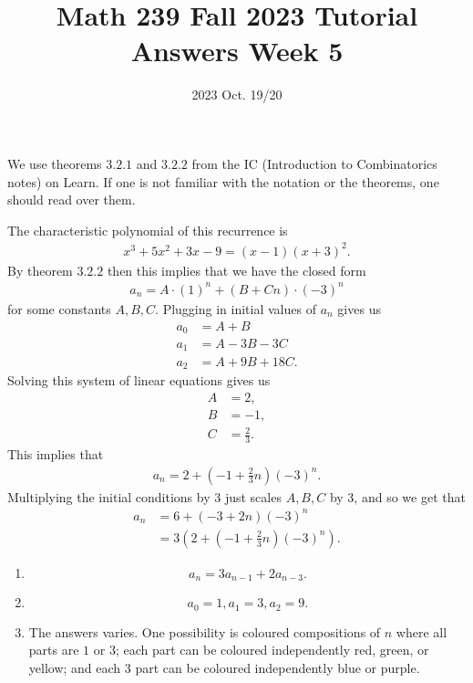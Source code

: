 \title{Math 239 Fall 2023 Tutorial Answers Week 5}
\date{2023 Oct. 19/20}
\maketitle

\begin{enumerate}
     We use theorems $3.2.1$ and $3.2.2$ from the IC (Introduction to Combinatorics notes) on Learn. If one is not familiar with the notation or the theorems, one should read over them.

    The characteristic polynomial of this recurrence is
    \begin{align*}
        x^3 + 5x^2 + 3x - 9 = (x-1) (x+3)^2.
    \end{align*}
    By theorem $3.2.2$ then this implies that we have the closed form
    \begin{align*}
        a_n = A \cdot (1)^n + (B + Cn) \cdot (-3)^n
    \end{align*}
    for some constants $A,B,C$. Plugging in initial values of $a_n$ gives us
    \begin{align*}
        a_0 &= A + B\\
        a_1 &= A - 3B - 3C\\
        a_2 &= A + 9B + 18C.
    \end{align*}
    Solving this system of linear equations gives us
    \begin{align*}
        A &= 2,\\
        B &= -1,\\
        C &= \frac{2}{3}.
    \end{align*}
    This implies that
    \begin{align*}
        a_n = 2 + (-1 + \tfrac{2}{3}n)(-3)^n.
    \end{align*}
    Multiplying the initial conditions by $3$ just scales $A,B,C$ by $3$, and so we get that
    \begin{align*}
        a_n &= 6 + (-3 + 2n)(-3)^n\\
        &= 3(2 + (-1 + \tfrac{2}{3}n)(-3)^n).
    \end{align*}

    \newpage
    \begin{enumerate}
        \item \[a_n = 3a_{n-1} + 2a_{n-3}.\]
        \item \[a_0 = 1, a_1 = 3, a_2 = 9.\]
        \item The answers varies. One possibility is coloured compositions of $n$ where all parts are $1$ or $3$; each part can be coloured independently red, green, or yellow; and each $3$ part can be coloured independently blue or purple. 
    \end{enumerate}


\end{enumerate}
